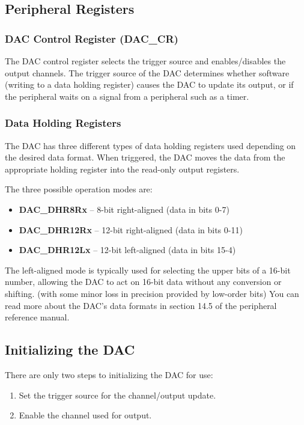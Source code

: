 \documentclass[11pt,fleqn]{book} %
\begin{document}
\subsection{Peripheral Registers}

\subsubsection{DAC Control Register (DAC\_CR)}
The DAC control register selects the trigger source and enables/disables the output channels. The trigger source of the DAC determines whether software (writing to a data holding register) causes the DAC to update its output, or if the peripheral waits on a signal from a peripheral such as a timer.  

\subsubsection{Data Holding Registers}
The DAC has three different types of data holding registers used depending on the desired data format. When triggered, the DAC moves the data from the appropriate holding register into the read-only output registers. 

The three possible operation modes are:
\begin{itemize}
    \item \textbf{DAC\_DHR8Rx} -- 8-bit right-aligned (data in bits 0-7)
    \item \textbf{DAC\_DHR12Rx} -- 12-bit right-aligned (data in bits 0-11)
    \item \textbf{DAC\_DHR12Lx} -- 12-bit left-aligned (data in bits 15-4)
\end{itemize}

The left-aligned mode is typically used for selecting the upper bits of a 16-bit number, allowing the DAC to act on 16-bit data without any conversion or shifting. (with some minor loss in precision provided by low-order bits) You can read more about the DAC's data formats in section 14.5 of the peripheral reference manual.

\subsection{Initializing the DAC}
There are only two steps to initializing the DAC for use:
\begin{enumerate}
    \item Set the trigger source for the channel/output update.
    \item Enable the channel used for output. 
\end{enumerate}
\end{document}
